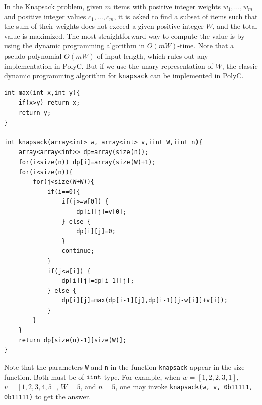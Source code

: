 \documentclass[runningheads]{llncs}
\begin{document}
\begin{example}
\label{exp:knapsack}
In the Knapsack problem, given $m$ items with positive integer weights $w_1, \ldots, w_m$ and positive integer values $c_1, \ldots, c_m$, it is asked to find a subset of items such that the sum of their weights does not exceed a given positive integer $W$, and the total value is maximized.
The most straightforward way to compute the value is by using the dynamic programming algorithm in $O(mW)$-time.
Note that a pseudo-polynomial $O(mW)$ of input length, which rules out any implementation in PolyC.
But if we use the unary representation of $W$, the classic dynamic programming algorithm for \texttt{knapsack}  can be implemented in PolyC.
\begin{lstlisting}
int max(int x,int y){
    if(x>y) return x;
    return y;
}

int knapsack(array<int> w, array<int> v,iint W,iint n){
    array<array<int>> dp=array(size(n));
    for(i<size(n)) dp[i]=array(size(W)+1);
    for(i<size(n)){
        for(j<size(W+W)){
            if(i==0){
                if(j>=w[0]) {
                    dp[i][j]=v[0];
                } else {
                    dp[i][j]=0;
                }
                continue;
            }
            if(j<w[i]) {
                dp[i][j]=dp[i-1][j];
            } else {
                dp[i][j]=max(dp[i-1][j],dp[i-1][j-w[i]]+v[i]);
            }
        }
    }
    return dp[size(n)-1][size(W)];
}
\end{lstlisting}
Note that the parameters \texttt{W} and \texttt{n} in the function \texttt{knapsack} appear in the size function.
Both must be of $\mathtt{iint}$ type.
For example, when $w = [1,2,2,3,1]$, $v = [1,2,3,4,5]$, $W = 5$, and $n = 5$, one may invoke \texttt{knapsack(w, v, 0b11111, 0b11111)} to get the answer.

\end{example}
\end{document}
